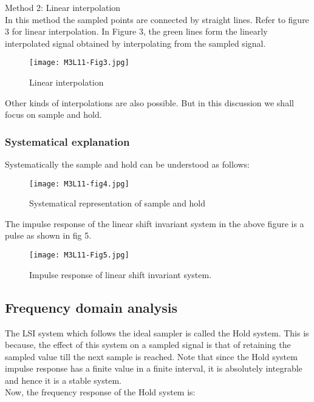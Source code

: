 \noindent Method 2: Linear interpolation\\
In this method the sampled points are connected by straight lines. Refer to figure 3 for linear interpolation.
In Figure 3, the green lines form the linearly interpolated signal obtained by interpolating from the sampled signal.



\begin{figure}[ht]
\centering
\texttt{[image: M3L11-Fig3.jpg]}
\caption{\label{fig:3} Linear interpolation}
\end{figure}


Other kinds of interpolations are also possible. But in this discussion we shall focus on sample and hold.

\subsubsection{Systematical explanation}

Systematically the sample and hold can be understood as follows:

\begin{figure}[ht]
\centering
\texttt{[image: M3L11-fig4.jpg]}
\caption{\label{fig:4} Systematical representation of sample and hold}
\end{figure}

The impulse response of the linear shift invariant system in the above figure is a pulse as shown in fig 5.

\begin{figure}[ht]
\centering
\texttt{[image: M3L11-Fig5.jpg]}
\caption{\label{fig:5} Impulse response of linear shift invariant system.
}\end{figure}

\subsection{Frequency domain analysis}
The LSI system which follows the ideal sampler is called the Hold system. This is because, the effect of this system on a sampled signal is that of retaining the sampled value till the next sample is reached. Note that since the Hold system impulse response has a finite value in a finite interval, it is absolutely integrable and hence it is a stable system.
\\
Now, the frequency response of the Hold system is:

